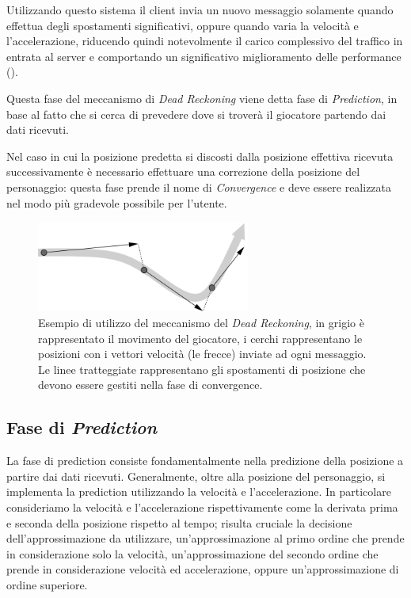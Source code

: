 \documentclass[a4paper,11pt]{article}
\begin{document}
Utilizzando questo sistema il client invia un nuovo messaggio solamente quando effettua degli spostamenti significativi, oppure quando varia la velocit\`a e l'accelerazione, riducendo quindi notevolmente il carico complessivo del traffico in entrata al server e comportando un significativo miglioramento delle performance (\cite{rif2}).

Questa fase del meccanismo di \emph{Dead Reckoning} viene detta fase di \emph{Prediction}, in base al fatto che si cerca di prevedere dove si trover\`a il giocatore partendo dai dati ricevuti.

Nel caso in cui la posizione predetta si discosti dalla posizione effettiva ricevuta successivamente \`e necessario effettuare una correzione della posizione del personaggio: questa fase prende il nome di \emph{Convergence} e deve essere realizzata nel modo pi\`u gradevole possibile per l'utente.

\begin{figure}[ht]
\centering
\includegraphics[height=3cm]{dr.png}
\caption{\small{Esempio di utilizzo del meccanismo del \emph{Dead Reckoning}, in grigio \`e rappresentato il movimento del giocatore, i cerchi rappresentano le posizioni con i vettori velocit\`a (le frecce) inviate ad ogni messaggio. Le linee tratteggiate rappresentano gli spostamenti di posizione che devono essere gestiti nella fase di convergence.}}
\label{img:dr}
\end{figure}

\subsection{Fase di \emph{Prediction}}

La fase di prediction consiste fondamentalmente nella predizione della posizione a partire dai dati ricevuti. Generalmente, oltre alla posizione del personaggio, si implementa la prediction utilizzando la velocit\`a e l'accelerazione. In particolare consideriamo la velocit\`a e l'accelerazione rispettivamente come la derivata prima e seconda della posizione rispetto al tempo; risulta cruciale la decisione dell'approssimazione da utilizzare, un'approssimazione al primo ordine che prende in considerazione solo la velocit\`a, un'approssimazione del secondo ordine che prende in considerazione velocit\`a ed accelerazione, oppure un'approssimazione di ordine superiore.
\end{document}

